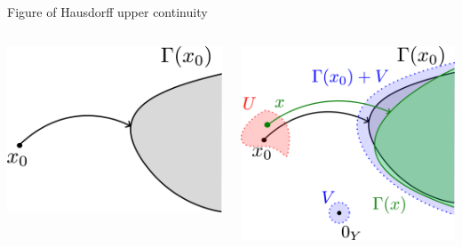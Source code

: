 \documentclass[aspectratio=169, dvipdfmx, 11pt]{beamer} %
\begin{document}
\begin{frame}[t]{Figure of Hausdorff upper continuity}
  \centering
  \begin{columns}
    \begin{column}{0.48\textwidth}
    \centering
    \includegraphics[keepaspectratio, scale=0.16]{figures/continuities/set_valued_mapping.eps}
    \end{column}
    \pause
    \begin{column}{0.48\textwidth}
    \centering
    \includegraphics[keepaspectratio, scale=0.16]{figures/continuities/h_upper_continuity.eps}
    \end{column}
  \end{columns}
\end{frame}
\end{document}

